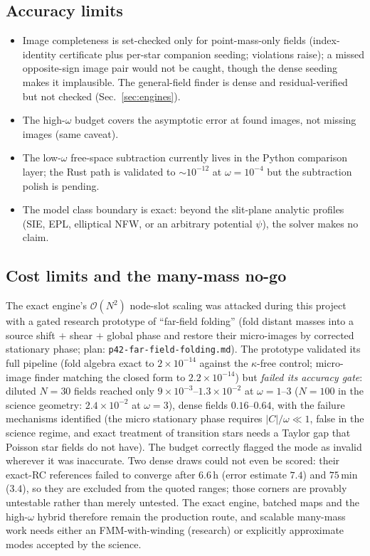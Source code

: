 \documentclass[11pt,a4paper]{article}
\begin{document}
\subsection{Accuracy limits}
\begin{itemize}
\item Image completeness is set-checked only for point-mass-only fields
  (index-identity certificate plus per-star companion seeding; violations
  raise); a missed opposite-sign image pair would not be caught, though the
  dense seeding makes it implausible.  The general-field finder is dense and
  residual-verified but not checked (Sec.~\ref{sec:engines}).
\item The high-$\omega$ budget covers the asymptotic error at found images,
  not missing images (same caveat).
\item The low-$\omega$ free-space subtraction currently lives in the Python
  comparison layer; the Rust path is validated to $\sim10^{-12}$ at
  $\omega = 10^{-4}$ but the subtraction polish is pending.
\item The model class boundary is exact: beyond the slit-plane analytic
  profiles (SIE, EPL, elliptical NFW, or an arbitrary potential $\psi$), the
  solver makes no claim.
\end{itemize}

\subsection{Cost limits and the many-mass no-go}
The exact engine's $\mathcal O(N^2)$ node-slot scaling was attacked during
this project with a gated research prototype of ``far-field folding''
(fold distant masses into a source shift $+$ shear $+$ global phase and
restore their micro-images by corrected stationary phase; plan:
\texttt{p42-far-field-folding.md}).  The prototype validated its full
pipeline (fold algebra exact to $2\times10^{-14}$ against the $\kappa$-free
control; micro-image finder matching the closed form to
$2.2\times10^{-14}$) but \emph{failed its accuracy gate}: diluted $N=30$
fields reached only $9\times10^{-3}$--$1.3\times10^{-2}$ at
$\omega = 1$--$3$ ($N=100$ in the science geometry: $2.4\times10^{-2}$ at
$\omega = 3$), dense fields $0.16$--$0.64$, with the failure mechanisms
identified (the micro stationary phase requires $|C|/\omega \ll 1$, false in
the science regime, and exact treatment of transition stars needs a
Taylor gap that Poisson star fields do not have).  The budget correctly
flagged the mode as invalid wherever it was inaccurate.  Two dense draws
could not even be scored: their exact-RC references failed to converge
after $6.6$\,h (error estimate $7.4$) and $75$\,min ($3.4$), so they are
excluded from the quoted ranges; those corners are provably untestable
rather than merely untested.  The exact engine,
batched maps and the high-$\omega$ hybrid therefore remain the production
route, and scalable many-mass work needs either an FMM-with-winding
(research) or explicitly approximate modes accepted by the science.
\end{document}
